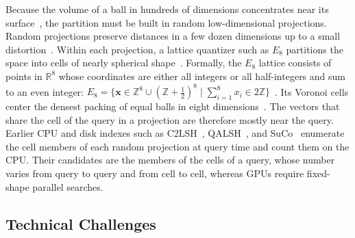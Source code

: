 \documentclass[letterpaper,twocolumn,10pt]{article}
\begin{document}
Because the volume of a ball in hundreds of dimensions concentrates near its surface~\cite{beyer1999meaningful}, the partition must be built in random low-dimensional projections. Random projections preserve distances in a few dozen dimensions up to a small distortion~\cite{johnson1984jl}. Within each projection, a lattice quantizer such as $E_8$ partitions the space into cells of nearly spherical shape~\cite{conway1999splag}. Formally, the $E_8$ lattice consists of points in $\mathbb{R}^8$ whose coordinates are either all integers or all half-integers and sum to an even integer: $E_8 = \{\mathbf{x} \in \mathbb{Z}^8 \cup (\mathbb{Z} + \frac{1}{2})^8 \mid \sum_{i=1}^8 x_i \in 2\mathbb{Z}\}$~\cite{conway1999splag}. Its Voronoi cells center the densest packing of equal balls in eight dimensions~\cite{conway1999splag,viazovska2017e8}. The vectors that share the cell of the query in a projection are therefore mostly near the query. Earlier CPU and disk indexes such as C2LSH~\cite{gan2012c2lsh}, QALSH~\cite{huang2015qalsh}, and SuCo~\cite{suco2025} enumerate the cell members of each random projection at query time and count them on the CPU. Their candidates are the members of the cells of a query, whose number varies from query to query and from cell to cell, whereas GPUs require fixed-shape parallel searches.


\subsection{Technical Challenges}
\label{sec:challenges}
\end{document}
